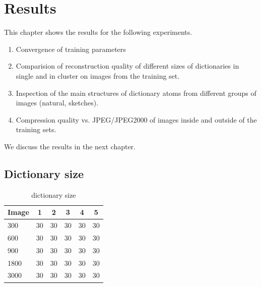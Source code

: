 \chapter{Results}
This chapter shows the results for the following experiments.

\begin{enumerate}
 \item Convergence of training parameters
 \item Comparision of reconstruction quality of different sizes of dictionaries
in single and in cluster on images from the training set. 
 \item Inspection of the main structures of dictionary atoms from different
groups of images (natural, sketches).
 \item Compression quality vs. JPEG/JPEG2000 of images inside and outside of the
training sets.
\end{enumerate}

We discuss the results in the next chapter.


\section{Dictionary size}
\begin{table}[h]
\caption{dictionary size}
\centering
\begin{tabular}{l  c  c  c  c  c}
\toprule
Image & 1 & 2 & 3 & 4 & 5 \\
\hline
300 & 30 & 30 & 30 & 30 & 30 \\
600 & 30 & 30 & 30 & 30 & 30 \\
900 & 30 & 30 & 30 & 30 & 30 \\
1800 & 30 & 30 & 30 & 30 & 30 \\
3000 & 30 & 30 & 30 & 30 & 30 \\
\bottomrule
\end{tabular}
\end{table}


